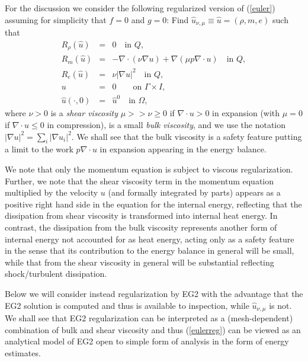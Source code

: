 For the discussion we consider the following regularized version
of (\ref{euler}) assuming for simplicity that $f=0$ and $g=0$: Find $\hat u_{\nu
,\mu}\equiv\hat u=(\rho ,m,e)$ such that
\begin{equation}\label{eulerreg}
\begin{array}{rcl}
R_\rho (\hat u)&=&  0 \quad \mbox{in } Q, \\
R_m (\hat u)&=&-\nabla\cdot (\nu\nabla u) +
\nabla (\mu p\nabla\cdot u) \quad \mbox{in } Q, \\
R_e (\hat u) &=&  \nu\vert \nabla u\vert^2 \quad \mbox{in } Q, \\
u&=&0\quad  \quad\mbox{on } \Gamma\times I,\\
\hat u(\cdot ,0)&=&\hat u^0\quad \mbox{in } \Omega ,
\end{array}
\end{equation}
where $\nu >0$ is a \emph{shear viscosity} $\mu >>\nu \ge 0$
if $\nabla\cdot u >0$ in expansion (with $\mu =0$ if $\nabla\cdot u \le 0$
in compression),
is a small \emph{bulk viscosity}, and
we use the notation
$\vert \nabla u\vert^2 =\sum_i\vert\nabla u_i\vert^2$. We shall
see that the bulk viscosity is a safety feature putting a limit
to the work $p\nabla\cdot u$ in expansion appearing in the energy balance.

We note that only the momentum equation is subject
to viscous regularization. Further, we note that
the shear viscosity term in the momentum
equation multiplied by the velocity $u$ (and formally integrated by parts)
appears as a positive right hand side in the equation for the internal
energy, reflecting that the dissipation from shear viscosity
is transformed into internal heat energy. In contrast, the
dissipation from the bulk viscosity represents
another form of internal energy not accounted for as heat energy,
acting only as a safety feature in the sense that its contribution
to the energy balance in general will be small, while that from the
shear viscosity in general will be substantial reflecting
shock/turbulent dissipation.

Below we will consider instead regularization by EG2 with the
advantage that the EG2 solution is computed and thus is
available to inspection, while $\hat u_{\nu ,\mu}$ is not.
We shall see that EG2 regularization can be interpreted
as a (mesh-dependent) combination of bulk and shear viscosity
and thus (\ref{eulerreg}) can be viewed as an analytical model
of EG2 open to simple form of analysis in the form of energy
estimates.


